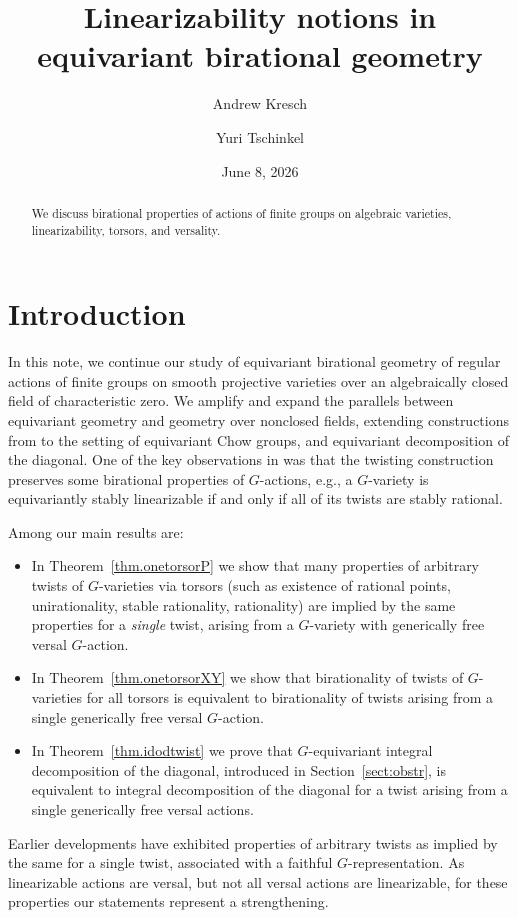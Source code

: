 \documentclass[12pt, reqno]{amsart}
\author{Andrew Kresch}
\author{Yuri Tschinkel}
\title[Equivariant birational geometry]{Linearizability notions in equivariant birational geometry}
\numberwithin{equation}{section}
\theoremstyle{plain}
\theoremstyle{definition}
\begin{document}
\date{June 8, 2026}

\begin{abstract}
We discuss birational properties of actions of finite groups on algebraic varieties, linearizability, torsors, and versality. 
\end{abstract}






\maketitle


\section{Introduction}
\label{sect:intro}


In this note, we continue our study of equivariant birational geometry of regular actions of finite groups on smooth projective varieties
over an algebraically closed field of characteristic zero. We amplify and expand the parallels between equivariant geometry and geometry over nonclosed fields, extending constructions from \cite{DR} to the setting of equivariant Chow groups, and equivariant decomposition of the diagonal. One of the key observations in \cite{DR} was that the twisting construction preserves some birational properties of $G$-actions, e.g., a $G$-variety is equivariantly stably linearizable if and only if all of its twists are stably rational. 


Among our main results are:
\begin{itemize}
\item In Theorem~\ref{thm.onetorsorP} we show that many properties of arbitrary twists of $G$-varieties via torsors (such as existence of rational points, unirationality, stable rationality, rationality) are implied by the same properties for a \emph{single} twist, arising from a $G$-variety with generically free versal $G$-action.  
\item In Theorem~\ref{thm.onetorsorXY} we show that birationality of twists of $G$-varieties 
for all torsors is equivalent to birationality of twists arising from a single generically free versal $G$-action.   
\item In Theorem~\ref{thm.idodtwist} we prove that $G$-equivariant integral decomposition of the diagonal, introduced in Section~\ref{sect:obstr}, is equivalent to integral decomposition of the diagonal for a twist arising from a single generically free versal actions.  
\end{itemize}
Earlier developments have exhibited properties of arbitrary twists as implied by the same for a single twist, associated with a faithful $G$-representation. 
As linearizable actions are versal, but not all versal actions are linearizable,
for these properties our statements represent a strengthening.
\end{document}
